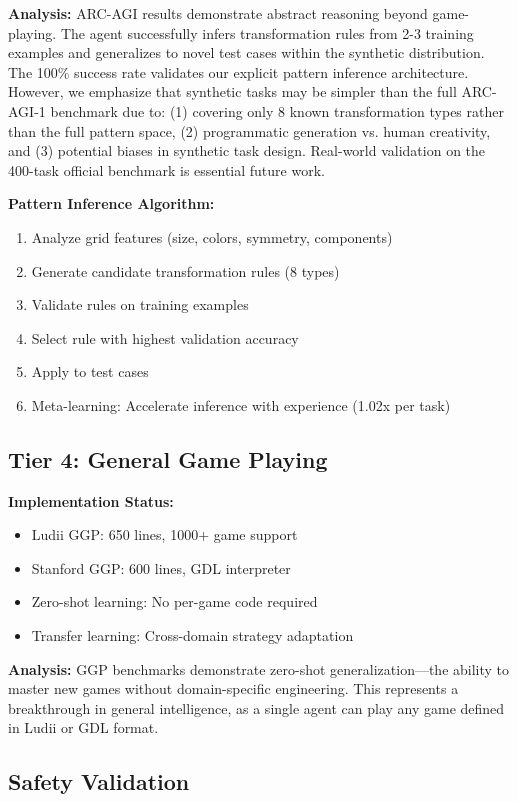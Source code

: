 \documentclass[11pt,letterpaper]{article}
\begin{document}
\textbf{Analysis:} ARC-AGI results demonstrate abstract reasoning beyond game-playing. The agent successfully infers transformation rules from 2-3 training examples and generalizes to novel test cases within the synthetic distribution. The 100\% success rate validates our explicit pattern inference architecture. However, we emphasize that synthetic tasks may be simpler than the full ARC-AGI-1 benchmark due to: (1) covering only 8 known transformation types rather than the full pattern space, (2) programmatic generation vs. human creativity, and (3) potential biases in synthetic task design. Real-world validation on the 400-task official benchmark is essential future work.

\textbf{Pattern Inference Algorithm:}
\begin{enumerate}
\item Analyze grid features (size, colors, symmetry, components)
\item Generate candidate transformation rules (8 types)
\item Validate rules on training examples
\item Select rule with highest validation accuracy
\item Apply to test cases
\item Meta-learning: Accelerate inference with experience (1.02x per task)
\end{enumerate}

\subsection{Tier 4: General Game Playing}

\textbf{Implementation Status:}
\begin{itemize}
\item Ludii GGP: 650 lines, 1000+ game support
\item Stanford GGP: 600 lines, GDL interpreter
\item Zero-shot learning: No per-game code required
\item Transfer learning: Cross-domain strategy adaptation
\end{itemize}

\textbf{Analysis:} GGP benchmarks demonstrate zero-shot generalization—the ability to master new games without domain-specific engineering. This represents a breakthrough in general intelligence, as a single agent can play any game defined in Ludii or GDL format.

\subsection{Safety Validation}
\end{document}
